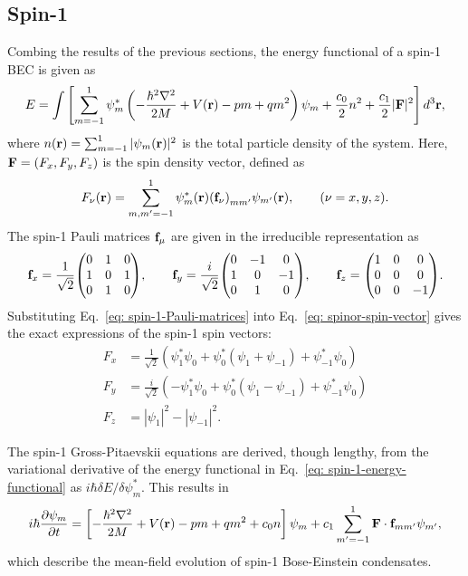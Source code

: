 \subsection{Spin-1}\label{subsec: spin-1-gpes}
Combing the results of the previous sections, the energy functional of a spin-1
BEC is given as~\cite{Kawaguchi2012}
\begin{equation}\label{eq: spin-1-energy-functional}
    E = \int \left[\sum_{m=-1}^1\psi_m^*\left(-\frac{\hbar^2\nabla^2}{2M}
        + V(\vb{r}) - pm + qm^2\right)\psi_m + \frac{c_0}{2}n^2
        + \frac{c_1}{2}|\vb{F}|^2\right] d^3\vb{r},
\end{equation}
where \(n(\vb{r}) = \sum_{m=-1}^{1}|\psi_m(\vb{r})|^2\) is the total particle
density of the system.
Here, \(\vb{F}=(F_x, F_y, F_z)\) is the spin density vector, defined as
\begin{equation}\label{eq: spinor-spin-vector}
    F_\nu(\vb{r}) = \sum_{m,m'=-1}^{1}\psi_m^*(\vb{r}){(\vb{f}_\nu)}_{mm'}
    \psi_{m'}(\vb{r}), \qquad (\nu=x, y, z).
\end{equation}
The spin-1 Pauli matrices \(\vb{f}_\mu \) are given in the irreducible
representation as
\begin{equation}\label{eq: spin-1-Pauli-matrices}
    \vb{f}_x = \frac{1}{\sqrt{2}}\mqty(0 & 1 & 0 \\ 1 & 0 & 1 \\ 0 & 1 & 0),
    \qquad
    \vb{f}_y = \frac{i}{\sqrt{2}}\mqty(0 & -1 & 0 \\ 1 & 0 & -1 \\ 0 & 1 & 0),
    \qquad
    \vb{f}_z = \mqty(1 & 0 & 0 \\ 0 & 0 & 0 \\ 0 & 0 & -1).
\end{equation}
Substituting Eq.~\eqref{eq: spin-1-Pauli-matrices} into
Eq.~\eqref{eq: spinor-spin-vector} gives the exact expressions of the spin-1
spin vectors:
\begin{align}\label{eq: spin-1-spin-vectors}
    F_x & = \frac{1}{\sqrt{2}} \left(\psi_1^*\psi_0 + \psi_0^*(\psi_1+\psi_{-1})
    + \psi_{-1}^*\psi_0\right)                                                   \\
    F_y & = \frac{i}{\sqrt{2}}\left(-\psi_1^*\psi_0 + \psi_0^*(\psi_1-\psi_{-1})
    +\psi_{-1}^*\psi_0\right)                                                    \\
    F_z & = |\psi_1|^2-|\psi_{-1}|^2.
\end{align}

The spin-1 Gross-Pitaevskii equations are derived, though lengthy, from the
variational derivative of the energy functional in
Eq.~\eqref{eq: spin-1-energy-functional} as \(i\hbar\delta E/\delta \psi_m^*\).
This results in
\begin{equation}\label{eq: spin-1-GPEs}
    i\hbar \pdv{\psi_m}{t} = \left[-\frac{\hbar^2\nabla^2}{2M} + V(\vb{r})
        - pm + qm^2 + c_0n\right]\psi_m
    + c_1\sum_{m'=-1}^{1}\vb{F}\cdot \vb{f}_{mm'}\psi_{m'},
\end{equation}
which describe the mean-field evolution of spin-1 Bose-Einstein condensates.

